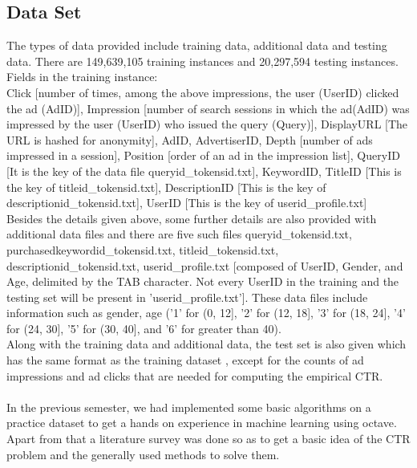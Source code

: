 \documentclass[10pt]{article}
\begin{document}
\subsection{Data Set}
The types of data provided include training data, additional data and testing data. There are 149,639,105 training instances and 20,297,594 testing instances.
Fields in the training instance:\\
Click [number of times, among the above impressions, the user (UserID) clicked the ad (AdID)], Impression [number of search sessions in which the ad(AdID) was impressed by the user (UserID) who issued the query (Query)], DisplayURL [The URL is hashed for anonymity], AdID, AdvertiserID, Depth [number of ads impressed in a session], Position [order of an ad in the impression list], QueryID [It is the key of the data file queryid\_tokensid.txt], KeywordID, TitleID [This is the key of titleid\_tokensid.txt], DescriptionID [This is the key of descriptionid\_tokensid.txt], UserID [This is the key of userid\_profile.txt]\\
Besides the details given above, some further details are also provided with additional data files and there are five such files queryid\_tokensid.txt, purchasedkeywordid\_tokensid.txt, titleid\_tokensid.txt, descriptionid\_tokensid.txt, userid\_profile.txt [composed of UserID, Gender, and Age, delimited by the TAB character. Not every UserID in the training and the testing set will be present in 'userid\_profile.txt']. 
These data files include information such as gender, age ('1'  for (0, 12],  '2' for (12, 18], '3' for (18, 24], '4'  for  (24, 30], '5' for (30,  40], and '6' for greater than 40).\\
Along with the training data and additional data, the test set is also given which has the same format as the training dataset , except for the counts of ad impressions and ad clicks that are needed for computing the empirical CTR.\\\\
In the previous semester, we had implemented some basic algorithms on a practice dataset to get a hands on experience in machine learning using octave. Apart from that a literature survey was done so as to get a basic idea of the CTR problem and the generally used methods to solve them. \\
\end{document}
